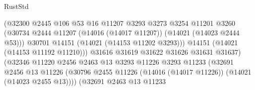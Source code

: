 \begin{lexlean}{RustStd}
\begin{coremodule}
                                            (@32300
                                              @2445
                                              @106
                                              @53
                                              @16
                                              @11207
                                              @3293
                                              @3273
                                              @3254
                                              @11201
                                              @3260
                                              (@30734
                                                @2444
                                                @11207
                                                (@14016 (@14017 @11207))
                                                (@14021 (@14023 @2444 @53)))
                                              @30701
                                              @14151
                                              (@14021 (@14153 @11202 @3293)))
                                            @14151
                                            (@14021 (@14153 @11192 @11210)))
                                          @31616
                                          @31619
                                          @31622
                                          @31626
                                          @31631
                                          @31637)
                                        (@32346
                                          @11220
                                          @2456
                                          @2463
                                          @13
                                          @3293
                                          @11226
                                          @3293
                                          @11233
                                          (@32691
                                            @2456
                                            @13
                                            @11226
                                            (@30796
                                              @2455
                                              @11226
                                              (@14016 (@14017 @11226))
                                              (@14021 (@14023 @2455 @13))))
                                          (@32691
                                            @2463
                                            @13
                                            @11233

\end{coremodule}
\end{lexlean}
